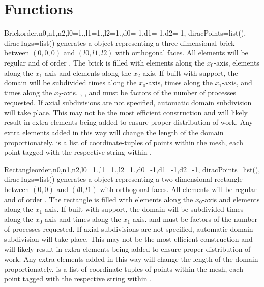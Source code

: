 \section{Functions}
\begin{funcdesc}{Brick}{order,n0,n1,n2,l0=1.,l1=1.,l2=1.,d0=-1,d1=-1,d2=-1,
diracPoints=list(), diracTags=list()}
generates a \Domain object representing a three-dimensional brick between
$(0,0,0)$ and $(l0,l1,l2)$ with orthogonal faces. All elements will be regular
and of order . The brick is filled with
 elements along the $x_0$-axis,
 elements along the $x_1$-axis and
 elements along the $x_2$-axis.
If built with \MPI support, the domain will be subdivided 
 times along the $x_0$-axis,
 times along the $x_1$-axis, and
 times along the $x_2$-axis.
, , and  must be factors of the number of
\MPI processes requested.
If axial subdivisions are not specified, automatic domain subdivision will take
place. This may not be the most efficient construction and will likely result in
extra elements being added to ensure proper distribution of work. Any extra
elements added in this way will change the length of the domain proportionately.
 is a list of coordinate-tuples of points within the mesh,
each point tagged with the respective string within .
\end{funcdesc}

\begin{funcdesc}{Rectangle}{order,n0,n1,n2,l0=1.,l1=1.,l2=1.,d0=-1,d1=-1,d2=-1,
diracPoints=list(), diracTags=list()}
generates a \Domain object representing a two-dimensional rectangle between
$(0,0)$ and $(l0,l1)$ with orthogonal faces. All elements will be regular
and of order . The rectangle is filled with
 elements along the $x_0$-axis and
 elements along the $x_1$-axis.
If built with \MPI support, the domain will be subdivided 
 times along the $x_0$-axis and
 times along the $x_1$-axis.
 and  must be factors of the number of \MPI processes requested.
If axial subdivisions are not specified, automatic domain subdivision will take
place. This may not be the most efficient construction and will likely result in
extra elements being added to ensure proper distribution of work. Any extra
elements added in this way will change the length of the domain proportionately.
 is a list of coordinate-tuples of points within the mesh,
each point tagged with the respective string within .
\end{funcdesc}
